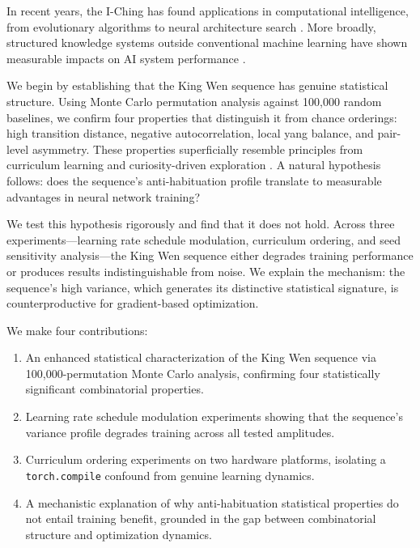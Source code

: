 \documentclass{article}
\begin{document}
In recent years, the I-Ching has found applications in computational intelligence, from evolutionary algorithms \cite{chen2016iching} to neural architecture search \cite{zhang2021asnas}. More broadly, structured knowledge systems outside conventional machine learning have shown measurable impacts on AI system performance \cite{choi2023confirm}.

We begin by establishing that the King Wen sequence has genuine statistical structure. Using Monte Carlo permutation analysis against 100,000 random baselines, we confirm four properties that distinguish it from chance orderings: high transition distance, negative autocorrelation, local yang balance, and pair-level asymmetry. These properties superficially resemble principles from curriculum learning \cite{bengio2009curriculum,graves2017automated} and curiosity-driven exploration \cite{schmidhuber2006developmental}. A natural hypothesis follows: does the sequence's anti-habituation profile translate to measurable advantages in neural network training?

We test this hypothesis rigorously and find that it does not hold. Across three experiments---learning rate schedule modulation, curriculum ordering, and seed sensitivity analysis---the King Wen sequence either degrades training performance or produces results indistinguishable from noise. We explain the mechanism: the sequence's high variance, which generates its distinctive statistical signature, is counterproductive for gradient-based optimization.

We make four contributions:

\begin{enumerate}
\tightlist
\item An enhanced statistical characterization of the King Wen sequence via 100,000-permutation Monte Carlo analysis, confirming four statistically significant combinatorial properties.
\item Learning rate schedule modulation experiments showing that the sequence's variance profile degrades training across all tested amplitudes.
\item Curriculum ordering experiments on two hardware platforms, isolating a \texttt{torch.compile} confound from genuine learning dynamics.
\item A mechanistic explanation of why anti-habituation statistical properties do not entail training benefit, grounded in the gap between combinatorial structure and optimization dynamics.
\end{enumerate}
\end{document}
